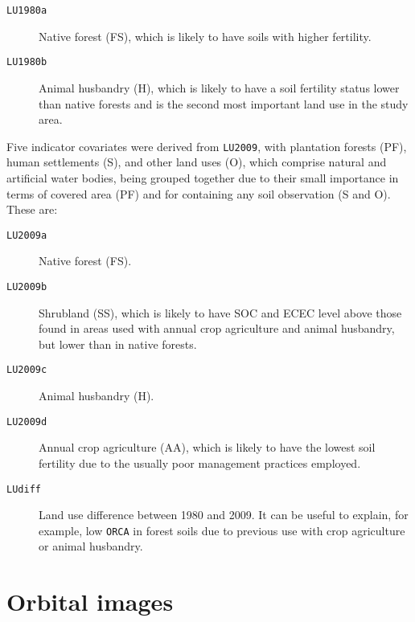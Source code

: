 \begin{description}
 \item[\texttt{LU1980a}] Native forest (FS), which is likely to have soils with higher fertility.
  
 \item[\texttt{LU1980b}] Animal husbandry (H), which is likely to have a soil fertility status lower than native 
 forests and is the second most important land use in the study area.
\end{description}

Five indicator covariates were derived from \texttt{LU2009}, with plantation forests (PF), human settlements 
(S), and other land uses (O), which comprise natural and artificial water bodies, being grouped together due to their
small importance in terms of covered area (PF) and for containing any soil observation (S and O). These are:

\begin{description}
 \item[\texttt{LU2009a}] Native forest (FS).
 
 \item[\texttt{LU2009b}] Shrubland (SS), which is likely to have SOC and ECEC level above  those found in areas used 
 with annual crop agriculture and animal husbandry, but lower than in native forests.
 
 \item[\texttt{LU2009c}] Animal husbandry (H).
  
 \item[\texttt{LU2009d}] Annual crop agriculture (AA), which is likely to have the lowest soil fertility due to 
 the usually poor management practices employed.
 
 \item[\texttt{LUdiff}] Land use difference between \num{1980} and \num{2009}. It can be useful to explain, for 
 example, low \texttt{ORCA} in forest soils due to previous use with crop agriculture or animal husbandry.
\end{description}

\tocless\section{Orbital images}
\label{sec:covar-data-sat-image}

